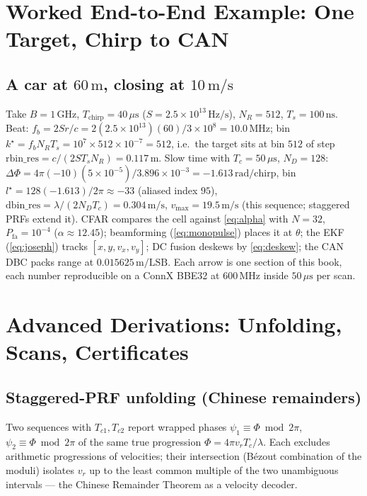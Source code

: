 \documentclass[11pt,oneside]{book}
\begin{document}
\chapter{Worked End-to-End Example: One Target, Chirp to CAN}
\label{ch:worked}

\section{A car at $60\,\mathrm{m}$, closing at $10\,\mathrm{m/s}$}
\label{sec:worked-numbers}

Take $B=1\,\mathrm{GHz}$, $T_{\mathrm{chirp}}=40\,\mu\mathrm{s}$
($S=2.5\times10^{13}\,\mathrm{Hz/s}$), $N_R=512$, $T_s=100\,\mathrm{ns}$.
Beat: $f_b=2Sr/c=2(2.5\times10^{13})(60)/3\times10^{8}=10.0\,\mathrm{MHz}$;
bin $k^\star=f_bN_RT_s=10^7\times512\times10^{-7}=512$, i.e.\ the target
sits at bin $512$ of step $\mathrm{rbin\_res}=c/(2ST_sN_R)=0.117\,\mathrm{m}$.
Slow time with $T_c=50\,\mu\mathrm{s}$, $N_D=128$:
$\Delta\Phi=4\pi(-10)(5\times10^{-5})/3.896\times10^{-3}=-1.613\,\mathrm{rad/chirp}$,
bin $l^\star=128(-1.613)/2\pi\approx-33$ (aliased index $95$),
$\mathrm{dbin\_res}=\lambda/(2N_DT_c)=0.304\,\mathrm{m/s}$,
$v_{\max}=19.5\,\mathrm{m/s}$ (this sequence; staggered PRFs extend it).
CFAR compares the cell against \cref{eq:alpha} with $N=32$,
$P_{\mathrm{fa}}=10^{-4}$ ($\alpha\approx12.45$); beamforming
(\cref{eq:monopulse}) places it at $\theta$; the EKF (\cref{eq:joseph})
tracks $[x,y,v_x,v_y]$; DC fusion deskews by \cref{eq:deskew}; the CAN
DBC packs range at $0.015625\,\mathrm{m/LSB}$. Each arrow is one section
of this book, each number reproducible on a ConnX BBE32 at $600\,\mathrm{MHz}$
inside $50\,\mu\mathrm{s}$ per scan.

\chapter{Advanced Derivations: Unfolding, Scans, Certificates}
\label{ch:derivations}

\section{Staggered-PRF unfolding (Chinese remainders)}
\label{sec:crt}

Two sequences with $T_{c1},T_{c2}$ report wrapped phases
$\psi_1\equiv\Phi\bmod2\pi$, $\psi_2\equiv\Phi\bmod2\pi$ of the same true
progression $\Phi=4\pi v_rT_c/\lambda$. Each excludes arithmetic
progressions of velocities; their intersection (B\'ezout combination of the
moduli) isolates $v_r$ up to the least common multiple of the two
unambiguous intervals --- the Chinese Remainder Theorem as a velocity
decoder.
\end{document}
